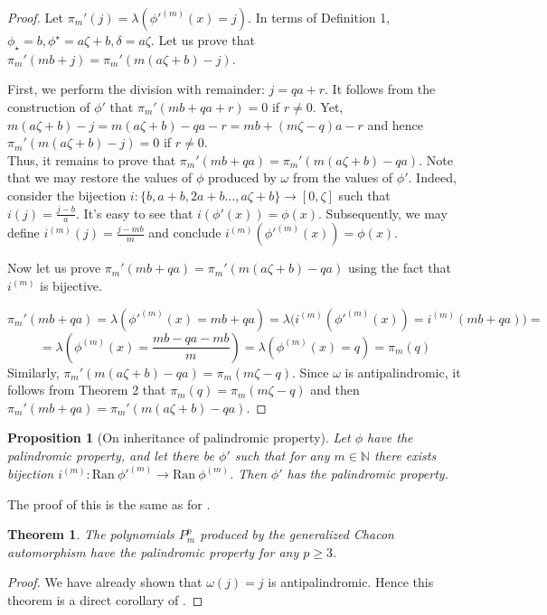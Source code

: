 \documentclass[a4paper]{article}
\theoremstyle{plain}
\newtheorem{theorem}{Theorem}[section]
\newtheorem{proposition}{Proposition}[section]
\theoremstyle{definition}
\begin{document}
\begin{proof}
Let $\pi_m'(j) = \lambda(\phi'^{(m)}(x)=j)$. In terms of Definition 1, $\phi_\star = b, \phi^\star = a\zeta + b, \delta = a\zeta$. Let us prove that $\pi_m'(mb + j) = \pi_m' (m(a\zeta+b)-j)$.

First, we perform the division with remainder: $j = qa + r$. It follows from the construction of $\phi'$ that $\pi_m'(mb + qa + r) = 0$ if $r \ne 0$. Yet, $m(a\zeta+b)-j = m(a\zeta+b)-qa - r = mb + (m\zeta -q)a - r$ and hence $\pi_m' (m(a\zeta+b)-j) = 0$ if $r \ne 0$.\\
Thus, it remains to prove that $\pi_m'(mb + qa) = \pi_m' (m(a\zeta+b)-qa)$.
Note that we may restore the values of $\phi$ produced by $\omega$ from the values of $\phi'$. Indeed, consider the bijection $i: \{b, a + b, 2a + b \ldots, a\zeta + b\} \rightarrow [0, \zeta]$ such that $i(j) = \frac{j-b}{a}$. It's easy to see that $i(\phi'(x))=\phi(x)$. Subsequently, we may define $i^{(m)}(j) = \frac{j-mb}{m}$ and conclude $i^{(m)}(\phi'^{(m)}(x))=\phi(x)$.

Now let us prove $\pi_m'(mb + qa) = \pi_m' (m(a\zeta+b)-qa)$ using the fact that $i^{(m)}$ is bijective.

\[\pi_m'(mb + qa) = \lambda(\phi'^{(m)}(x)=mb + qa) = \lambda\big(i^{(m)}(\phi'^{(m)}(x))=i^{(m)}(mb + qa)\big)  =\]\[= \lambda(\phi^{(m)}(x)= \frac{mb-qa-mb}{m})= \lambda(\phi^{(m)}(x)= q)=\pi_m(q)\]
Similarly, $\pi_m' (m(a\zeta+b)-qa) = \pi_m(m\zeta - q)$. Since $\omega$ is antipalindromic, it follows from Theorem 2 that $\pi_m(q) = \pi_m(m \zeta - q)$ and then $\pi_m'(mb + qa) = \pi_m' (m(a\zeta+b)-qa)$.
\end{proof}
\begin{proposition}[On inheritance of palindromic property]
Let $\phi$ have the palindromic property, and let there be $\phi'$ such that for any $m \in \mathbb{N}$ there exists bijection $i^{(m)}: \mathrm{Ran}\ \phi'^{(m)} \rightarrow \mathrm {Ran}\ \phi^{(m)}$. Then $\phi'$ has the palindromic property.
\end{proposition}
The proof of this is the same as for .

\begin{theorem}\label{pal_property}
The polynomials $P_m^p$ produced by the generalized Chacon automorphism have the palindromic property for any $p \ge 3$.
\end{theorem}
\begin{proof}
We have already shown that $\omega(j)=j$ is antipalindromic. Hence this theorem is a direct corollary of  .
\end{proof}
\end{document}
